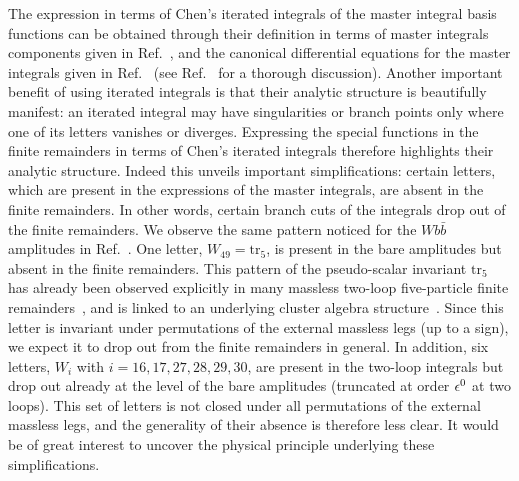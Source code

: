 \documentclass[main.tex]{subfiles}
\begin{document}
The expression in terms of Chen's iterated integrals of the master integral basis functions can be obtained through their definition in terms of master integrals components given in Ref.~\cite{Badger:2021nhg}, and the canonical differential equations for the master integrals given in Ref.~\cite{Abreu:2020jxa} (see Ref.~\cite{Badger:2021nhg} for a thorough discussion). Another important benefit of using iterated integrals is that their analytic structure is beautifully manifest: an iterated integral may have singularities or branch points only where one of its letters vanishes or diverges. Expressing the special functions in the finite remainders in terms of Chen's iterated integrals therefore highlights their analytic structure. Indeed this unveils important simplifications: certain letters, which are present in the expressions of the master integrals, are absent in the finite remainders. In other words, certain branch cuts of the integrals drop out of the finite remainders. We observe the same pattern noticed for the $Wb\bar{b}$ amplitudes in Ref.~\cite{Badger:2021nhg}. One letter, $W_{49} = \text{tr}_5$, is present in the bare amplitudes but absent in the finite remainders. This pattern of the pseudo-scalar invariant $\text{tr}_5$ has already been observed explicitly in many massless two-loop five-particle finite remainders~\cite{Badger:2018enw,Abreu:2018zmy,Abreu:2018aqd,Chicherin:2018yne,Chicherin:2019xeg,Abreu:2019rpt,Abreu:2019odu,Badger:2019djh,Caron-Huot:2020vlo,Abreu:2020cwb,Chawdhry:2020for}, and is linked to an underlying cluster algebra structure~\cite{Chicherin:2020umh}. Since this letter is invariant under permutations of the external massless legs (up to a sign), we expect it to drop out from the finite remainders in general.
In addition, six letters, $W_i$ with $i=16,17,27,28,29,30$, are present in the two-loop integrals but drop out already at the level of the bare amplitudes (truncated at order $\epsilon^0$ at two loops). This set of letters is not closed under all permutations of the external massless legs, and the generality of their absence is therefore less clear.
It would be of great interest to uncover the physical principle underlying these simplifications.
\end{document}
